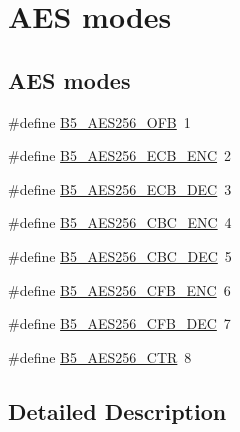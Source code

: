 \hypertarget{group__aes_modes}{\section{A\-E\-S modes}
\label{group__aes_modes}
}
\subsection*{A\-E\-S modes}
\begin{DoxyCompactItemize}
\item 
\#define \hyperlink{group__aes_modes_gaa6e9c20473b20e271d541e65ad22b31a}{B5\-\_\-\-A\-E\-S256\-\_\-\-O\-F\-B}~1
\item 
\#define \hyperlink{group__aes_modes_gaa10e7bc21ff6269423c0843ab06523de}{B5\-\_\-\-A\-E\-S256\-\_\-\-E\-C\-B\-\_\-\-E\-N\-C}~2
\item 
\#define \hyperlink{group__aes_modes_ga7cc574715866041d7702bc928392b34d}{B5\-\_\-\-A\-E\-S256\-\_\-\-E\-C\-B\-\_\-\-D\-E\-C}~3
\item 
\#define \hyperlink{group__aes_modes_ga3e837386acbd4a8b0de7908eda9d4615}{B5\-\_\-\-A\-E\-S256\-\_\-\-C\-B\-C\-\_\-\-E\-N\-C}~4
\item 
\#define \hyperlink{group__aes_modes_ga2fd07638d5700e2c86ed99d768af5b64}{B5\-\_\-\-A\-E\-S256\-\_\-\-C\-B\-C\-\_\-\-D\-E\-C}~5
\item 
\#define \hyperlink{group__aes_modes_ga1778510b0460d082eb81882fe4b801ab}{B5\-\_\-\-A\-E\-S256\-\_\-\-C\-F\-B\-\_\-\-E\-N\-C}~6
\item 
\#define \hyperlink{group__aes_modes_ga4eefc1defbce48425c854893666ee36a}{B5\-\_\-\-A\-E\-S256\-\_\-\-C\-F\-B\-\_\-\-D\-E\-C}~7
\item 
\#define \hyperlink{group__aes_modes_gada09a78164ed48a74b4320a0a3ccf7dd}{B5\-\_\-\-A\-E\-S256\-\_\-\-C\-T\-R}~8
\end{DoxyCompactItemize}


\subsection{Detailed Description}


